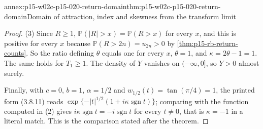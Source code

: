 \begin{annexitem}{annex:p15-w02c-p15-020-return-domain}{thm:p15-w02c-p15-020-return-domain}{Domain of attraction, index and skewness from the transform limit}
\begin{proof}
(3) Since \(R\geq1\), \(\mathbb P(|R|>x)=\mathbb P(R>x)\) for every
\(x\), and this is positive for every \(x\) because
\(\mathbb P(R>2n)=u_{2n}>0\) by \cref{thm:p15-rb-return-counts}. So the
ratio defining \(\theta\) equals one for every \(x\), \(\theta=1\), and
\(\kappa=2\theta-1=1\). The same holds for \(T_1\geq1\). The density of
\(Y\) vanishes on \((-\infty,0]\), so \(Y>0\) almost surely.

Finally, with \(c=0\), \(b=1\), \(\alpha=1/2\) and
\(w_{1/2}(t)=\tan(\pi/4)=1\), the printed form (3.8.11) reads
\(\exp\{-|t|^{1/2}(1+i\kappa\operatorname{sgn}t)\}\); comparing with the
function computed in (2) gives \(i\kappa\operatorname{sgn}t=
-i\operatorname{sgn}t\) for every \(t\neq0\), that is \(\kappa=-1\) in a
literal match. This is the comparison stated after the theorem.
\end{proof}
\end{annexitem}

